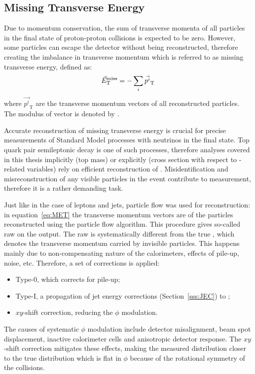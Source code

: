 \subsection{Missing Transverse Energy}
\label{ss:MET_reconstruction}
Due to momentum conservation, the sum of transverse momenta of all particles in the final state of proton-proton
collisions is expected to be zero. However, some particles can escape the detector without being reconstructed,
therefore creating the imbalance in transverse momentum which is referred to as missing transverse energy, defined as:
\begin{equation}
\label{eq:MET}
\vec{E}_\mathrm{T}^\textrm{miss} = - \sum_i \vec{p^i}_\mathrm{T}
\end{equation}
where $\vec{p^i}_\mathrm{T}$ are the transverse momentum vectors of all reconstructed particles. The modulus of
\METvec vector is denoted by \MET.

Accurate reconstruction of missing transverse energy is crucial for precise measurements of Standard Model processes
with neutrinos in the final state. Top quark pair semileptonic decay is one of such processes, therefore analyses
covered in this thesis implicitly (top mass) or explicitly (\ttbar cross section with respect to \MET-related variables)
rely on efficient reconstruction of \METvec. Misidentification and misreconstruction of any visible particles in the
event contribute to \METvec measurement, therefore it is a rather demanding task.

Just like in the case of leptons and jets, particle flow was used for \METvec reconstruction: in equation~\ref{eq:MET}
the transverse momentum vectors are of the particles reconstructed using the particle flow algorithm. This procedure
gives so-called raw \METvec on the output. The raw \METvec is systematically different from the true \METvec, which
denotes the transverse momentum carried by invisible particles. This happens mainly due to non-compensating nature of
the calorimeters, effects of pile-up, noise, etc. Therefore, a set of corrections is applied:
\begin{itemize}
 \item Type-0, which corrects \MET for pile-up;
 \item Type-I, a propagation of jet energy corrections (Section~\ref{sss:JEC}) to \MET;
 \item $xy$-shift correction, reducing the \METvec $\phi$ modulation.
\end{itemize}

The causes of systematic \METvec $\phi$ modulation include detector misalignment, beam spot displacement, inactive
calorimeter cells and anisotropic detector response. The $xy$-shift correction mitigates these effects, making the
measured \METvec distribution closer to the true \METvec distribution which is flat in $\phi$ because of the rotational
symmetry of the collisions.

